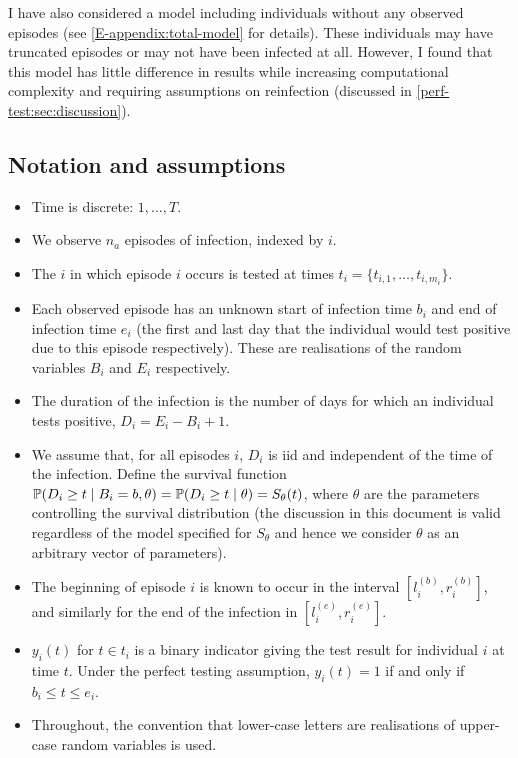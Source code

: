 \documentclass[thesis.tex]{subfiles}
\begin{document}
I have also considered a model including individuals without any observed episodes (see \cref{E-appendix:total-model} for details).
These individuals may have truncated episodes or may not have been infected at all.
However, I found that this model has little difference in results while increasing computational complexity and requiring assumptions on reinfection (discussed in \cref{perf-test:sec:discussion}).

\subsection{Notation and assumptions}
\begin{itemize}
\item
  Time is discrete: $1, \dots, T$.
\item
  We observe $n_a$ episodes of infection, indexed by $i$.
\item
  The $i$ in which episode $i$ occurs is tested at times
  $t_i = \{ t_{i,1}, \dots, t_{i,m_i} \}$.
\item
  Each observed episode has an unknown start of infection time $b_i$
  and end of infection time $e_i$ (the first and last day that the
  individual would test positive due to this episode respectively).
  These are realisations of the random variables $B_i$ and $E_i$
  respectively.
\item
  The duration of the infection is the number of days for which an
  individual tests positive, $D_i = E_i - B_i + 1$.
\item
  We assume that, for all episodes $i$, $D_i$ is iid and independent
  of the time of the infection. Define the survival function
  $\operatorname{\mathbb{P}}(D_i \geq t \mid B_i = b, \theta) = \operatorname{\mathbb{P}}(D_i \geq t \mid \theta) = S_\theta(t)$,
  where $\theta$ are the parameters controlling the survival
  distribution (the discussion in this document is valid regardless of
  the model specified for $S_\theta$ and hence we consider $\theta$
  as an arbitrary vector of parameters).
\item
  The beginning of episode $i$ is known to occur in the interval
  $[l_i^{(b)}, r_i^{(b)}]$, and similarly for the end of the infection
  in $[l_i^{(e)}, r_i^{(e)}]$.
\item
  $y_i(t)$ for $t \in t_i$ is a binary indicator giving the test
  result for individual $i$ at time $t$. Under the perfect testing
  assumption, $y_i(t) = 1$ if and only if $b_i \leq t \leq e_i$.
\item
  Throughout, the convention that lower-case letters are realisations of
  upper-case random variables is used.
\end{itemize}
\end{document}
